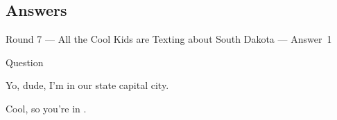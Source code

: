 \documentclass[11pt]{beamer}
\begin{document}
\subsection{Answers}
\begin{frame}[t]{Round 7 --- All the Cool Kids are Texting about South Dakota --- \mbox{Answer 1}}
\begin{block}{Question}

\begin{minipage}{0.9\textwidth}
\begin{mdframed}[
    roundcorner=7pt,
    backgroundcolor=black!5,
    linecolor=black!5,
    fontcolor=black,
    ignorelastdescenders]
\begin{flushleft}
{\small{}\selectfont{}
Yo, dude, I'm in our state capital city.
}
\end{flushleft}
\end{mdframed}
\end{minipage}

\hfill{}\begin{minipage}{0.9\textwidth}
\begin{mdframed}[
    roundcorner=7pt,
    backgroundcolor=blue!80!white,
    linecolor=blue!80!white,
    fontcolor=white,
    ignorelastdescenders]
\begin{flushleft}
{\small{}\selectfont{}
Cool, so you're in \textunderscore{}\textunderscore{}\textunderscore{}\textunderscore{}\textunderscore{}\textunderscore{}.
}
\end{flushleft}
\end{mdframed}
\end{minipage}
\end{block}
\end{frame}
\end{document}
